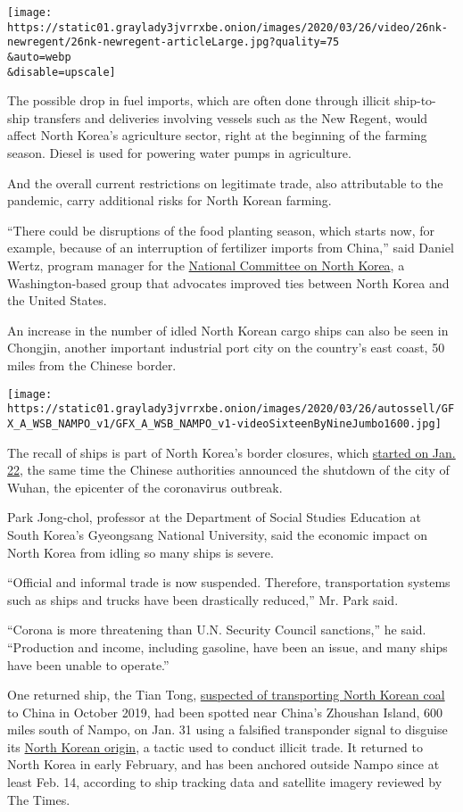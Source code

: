 \texttt{[image: https://static01.graylady3jvrrxbe.onion/images/2020/03/26/video/26nk-newregent/26nk-newregent-articleLarge.jpg?quality=75\\\&auto=webp\\\&disable=upscale]}

The possible drop in fuel imports, which are often done through illicit
ship-to-ship transfers and deliveries involving vessels such as the New
Regent, would affect North Korea's agriculture sector, right at the
beginning of the farming season. Diesel is used for powering water pumps
in agriculture.

And the overall current restrictions on legitimate trade, also
attributable to the pandemic, carry additional risks for North Korean
farming.

``There could be disruptions of the food planting season, which starts
now, for example, because of an interruption of fertilizer imports from
China,'' said Daniel Wertz, program manager for the
\href{https://www.ncnk.org/}{National Committee on North Korea}, a
Washington-based group that advocates improved ties between North Korea
and the United States.

An increase in the number of idled North Korean cargo ships can also be
seen in Chongjin, another important industrial port city on the
country's east coast, 50 miles from the Chinese border.

\texttt{[image: https://static01.graylady3jvrrxbe.onion/images/2020/03/26/autossell/GFX\_A\_WSB\_NAMPO\_v1/GFX\_A\_WSB\_NAMPO\_v1-videoSixteenByNineJumbo1600.jpg]}

The recall of ships is part of North Korea's border closures, which
\href{https://www.nytimes3xbfgragh.onion/2020/01/21/world/asia/coronavirus-china-north-korea-tourism-ban.html}{started
on Jan. 22}, the same time the Chinese authorities announced the
shutdown of the city of Wuhan, the epicenter of the coronavirus
outbreak.

Park Jong-chol, professor at the Department of Social Studies Education
at South Korea's Gyeongsang National University, said the economic
impact on North Korea from idling so many ships is severe.

``Official and informal trade is now suspended. Therefore,
transportation systems such as ships and trucks have been drastically
reduced,'' Mr. Park said.

``Corona is more threatening than U.N. Security Council sanctions,'' he
said. ``Production and income, including gasoline, have been an issue,
and many ships have been unable to operate.''

One returned ship, the Tian Tong,
\href{https://rusi.org/publication/other-publications/project-sandstone-report-6-phantom-fleet-north-korea\%E2\%80\%99s-smugglers}{suspected
of transporting North Korean coal} to China in October 2019, had been
spotted near China's Zhoushan Island, 600 miles south of Nampo, on Jan.
31 using a falsified transponder signal to disguise its
\href{https://www.nvmc.uscg.gov/(S(mzndz5zaouhzdtvaaooeu3sp))/CAATSA.aspx}{North
Korean origin}, a tactic used to conduct illicit trade. It returned to
North Korea in early February, and has been anchored outside Nampo since
at least Feb. 14, according to ship tracking data and satellite imagery
reviewed by The Times.


